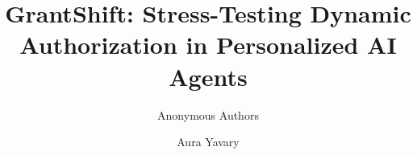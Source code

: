\usepackage[margin=0.72in]{geometry}
\usepackage{times}
\usepackage{microtype}
\usepackage{graphicx}
\usepackage{booktabs}
\usepackage{amsmath,amssymb}
\usepackage{hyperref}
\usepackage{enumitem}
\usepackage{multirow}
\usepackage{natbib}
\usepackage{xcolor}
\usepackage{url}
\hypersetup{hidelinks}
\setlength{\columnsep}{0.22in}
\setlength{\parindent}{1em}
\setlength{\parskip}{0pt}
\newcommand{\system}{GrantShift}
\newcommand{\ppgap}{\mathrm{PPG}}
\title{GrantShift: Stress-Testing Dynamic Authorization in Personalized AI Agents}
\ifanonymous
\author{Anonymous Authors}
\else
\author{Aura Yavary}
\fi
\date{}

\maketitle
\begin{abstract}

\end{abstract}
